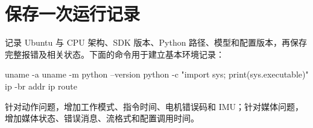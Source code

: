 \section{保存一次运行记录}
记录 Ubuntu 与 CPU 架构、SDK 版本、Python 路径、模型和配置版本，再保存完整报错及相关状态。下面的命令用于建立基本环境记录：
\par\noindent\begin{minipage}{\linewidth}
\begin{command}
uname -a
uname -m
python --version
python -c "import sys; print(sys.executable)"
ip -br addr
ip route
\end{command}
\end{minipage}\par

针对动作问题，增加工作模式、指令时间、电机错误码和 IMU；针对媒体问题，增加媒体状态、错误消息、流格式和配置调用时间。
